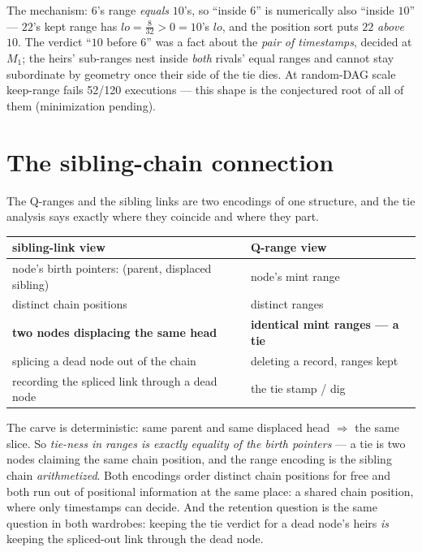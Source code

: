 \documentclass[11pt]{article}
\begin{document}
\noindent The mechanism: $6$'s range \emph{equals} $10$'s, so ``inside
$6$'' is numerically also ``inside $10$'' --- $22$'s kept range has
$lo = \tfrac{8}{32} > 0 = 10$'s $lo$, and the position sort puts $22$
\emph{above} $10$. The verdict ``$10$ before $6$'' was a fact about the
\emph{pair of timestamps}, decided at $M_1$; the heirs' sub-ranges nest
inside \emph{both} rivals' equal ranges and cannot stay subordinate by
geometry once their side of the tie dies. At random-DAG scale keep-range
fails 52/120 executions --- this shape is the conjectured root of all of
them (minimization pending).

\section{The sibling-chain connection}

The Q-ranges and the sibling links are two encodings of one structure,
and the tie analysis says exactly where they coincide and where they
part.

\begin{center}\small
\begin{tabular}{@{}ll@{}}
\toprule
sibling-link view & Q-range view \\
\midrule
node's birth pointers: (parent, displaced sibling) & node's mint range \\
distinct chain positions & distinct ranges \\
\textbf{two nodes displacing the same head} & \textbf{identical mint
  ranges --- a tie} \\
splicing a dead node out of the chain & deleting a record, ranges kept \\
recording the spliced link through a dead node & the tie stamp / dig \\
\bottomrule
\end{tabular}
\end{center}

\noindent The carve is deterministic: same parent and same displaced
head $\Rightarrow$ the same slice. So \emph{tie-ness in ranges is
exactly equality of the birth pointers} --- a tie is two nodes claiming
the same chain position, and the range encoding is the sibling chain
\emph{arithmetized}. Both encodings order distinct chain positions for
free and both run out of positional information at the same place: a
shared chain position, where only timestamps can decide. And the
retention question is the same question in both wardrobes: keeping the
tie verdict for a dead node's heirs \emph{is} keeping the spliced-out
link through the dead node.
\end{document}
